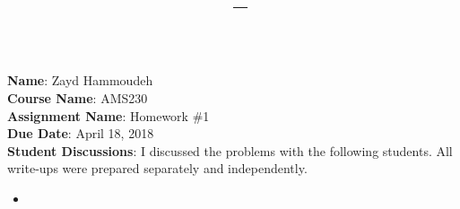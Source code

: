 \documentclass{report}
\title{\textbf{\course\ -- \assnName}}
\author{\name}
\newcommand{\course}{AMS230}
\newcommand{\assnName}{Homework \#1}
\begin{document}
  \maketitle

  \noindent
  \textbf{Name}: Zayd Hammoudeh \\
  \textbf{Course Name}: \course \\
  \textbf{Assignment Name}: \assnName \\
  \textbf{Due Date}: April 18, 2018 \\
  \textbf{Student Discussions}: I discussed the problems with the following students.  All write-ups were prepared separately and independently. \\
  \vspace{-1em}
  \begin{itemize}
    \item 
  \end{itemize}

  \newpage
  
  
  \newpage
  
  
  \newpage
  
  
  \newpage
  
  
  \newpage
  
  
  \newpage
  
\end{document}
